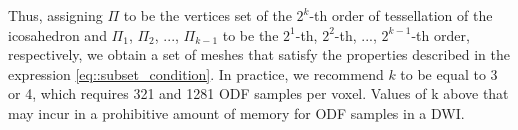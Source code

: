 \documentclass[twoside,twocolumn,10pt]{article}
\begin{document}
Thus, assigning $\Pi$ to be the vertices set of the $2^k$-th order of tessellation of the icosahedron and $\Pi_1$, $\Pi_2$, ..., $\Pi_{k-1}$ to be the $2^{1}$-th, $2^{2}$-th, ..., $2^{k-1}$-th order, respectively, we obtain a set of meshes that satisfy the properties described in the expression \ref{eq::subset_condition}. In practice, we recommend $k$ to be equal to 3 or 4, which requires 321 and 1281 ODF samples per voxel. Values of k above that may incur in a prohibitive amount of memory for ODF samples in a DWI.








\end{document}
